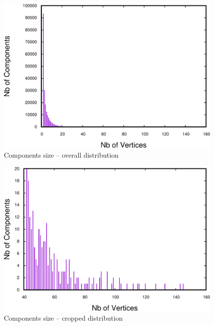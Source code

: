 




\begin{figure}
\centering
\includegraphics[scale=0.35]{bench/frequencyall-crop.pdf}
\caption{Components size -- overall distribution}
\label{fig:cs-overall}
\end{figure}

\begin{figure}
\centering
\includegraphics[scale=0.35]{bench/frequency-selected-crop.pdf}
\caption{Components size -- cropped distribution}
\label{fig:cs-selected}
\end{figure}

